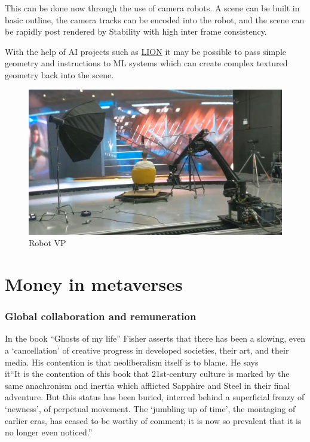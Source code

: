 This can be done now through the use of camera robots. A scene can be built in basic outline, the camera tracks can be encoded into the robot, and the scene can be rapidly post rendered by Stability with high inter frame consistency.\par
With the help of AI projects such as \href{https://nv-tlabs.github.io/LION/}{LION} it may be possible to pass simple geometry and instructions to ML systems which can create complex textured geometry back into the scene.
\begin{figure}[ht]\centering 	\includegraphics{robotvp}
	\caption{Robot VP}
	\label{fig:robotvp}
\end{figure}

\section{Money in metaverses}
\subsubsection{Global collaboration and remuneration}
In the book ``Ghosts of my life'' \cite{fisher2014ghosts} Fisher asserts that there has been a slowing, even a `cancellation' of creative progress in developed societies, their art, and their media. His contention is that neoliberalism itself is to blame. He says\\
it{``It is the contention of this book that 21st-century culture is marked by the same anachronism and inertia which afflicted Sapphire and Steel in their final adventure. But this status has been buried, interred behind a superficial frenzy of ‘newness’, of perpetual movement. The ‘jumbling up of time’, the montaging of earlier eras, has ceased to be worthy of comment; it is now so prevalent that it is no longer even noticed.''}

